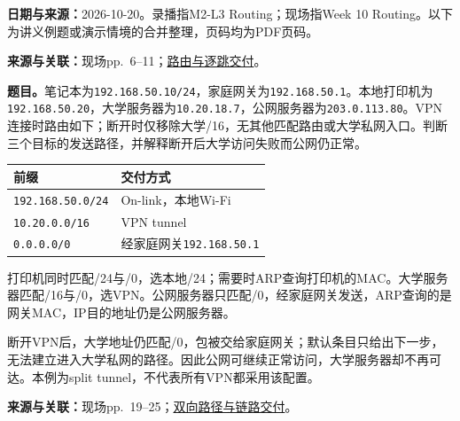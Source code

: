 \begingroup
\renewcommand{\recordid}[1]{}
\renewcommand{\relatedtopic}[2]{\hyperref[topic:#1]{#2}}


\textbf{日期与来源：}2026-10-20。录播指M2-L3 Routing；现场指Week 10 Routing。以下为讲义例题或演示情境的合并整理，页码均为PDF页码。


\textbf{来源与关联：}现场pp.~6--11；\relatedtopic{SC2008-L07-T01}{路由与逐跳交付}。

\textbf{题目。}笔记本为\texttt{192.168.50.10/24}，家庭网关为\texttt{192.168.50.1}。本地打印机为\texttt{192.168.50.20}，大学服务器为\texttt{10.20.18.7}，公网服务器为\texttt{203.0.113.80}。VPN连接时路由如下；断开时仅移除大学/16，无其他匹配路由或大学私网入口。判断三个目标的发送路径，并解释断开后大学访问失败而公网仍正常。

\begin{center}
\small
\begin{tabular}{@{}ll@{}}
\toprule
前缀 & 交付方式 \\
\midrule
\texttt{192.168.50.0/24} & On-link，本地Wi-Fi \\
\texttt{10.20.0.0/16} & VPN tunnel \\
\texttt{0.0.0.0/0} & 经家庭网关\texttt{192.168.50.1} \\
\bottomrule
\end{tabular}
\end{center}

\begin{workedsolution}
打印机同时匹配/24与/0，选本地/24；需要时ARP查询打印机的MAC。大学服务器匹配/16与/0，选VPN。公网服务器只匹配/0，经家庭网关发送，ARP查询的是网关MAC，IP目的地址仍是公网服务器。

断开VPN后，大学地址仍匹配/0，包被交给家庭网关；默认条目只给出下一步，无法建立进入大学私网的路径。因此公网可继续正常访问，大学服务器却不再可达。本例为split tunnel，不代表所有VPN都采用该配置。
\end{workedsolution}


\textbf{来源与关联：}现场pp.~19--25；\relatedtopic{SC2008-L07-T01}{双向路径与链路交付}。

